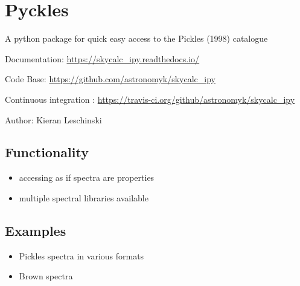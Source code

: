 

\section{Pyckles%
  \label{pyckles}%
}

A python package for quick easy access to the Pickles (1998) catalogue

Documentation: \url{https://skycalc_ipy.readthedocs.io/}

Code Base: \url{https://github.com/astronomyk/skycalc_ipy}

Continuous integration : \url{https://travis-ci.org/github/astronomyk/skycalc_ipy}

Author: Kieran Leschinski


\subsection{Functionality%
  \label{functionality}%
}

\begin{itemize}
\item accessing as if spectra are properties

\item multiple spectral libraries available
\end{itemize}


\subsection{Examples%
  \label{examples}%
}

\begin{itemize}
\item Pickles spectra in various formats

\item Brown spectra
\end{itemize}
